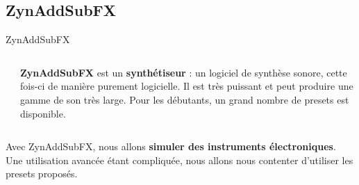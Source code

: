 \documentclass{beamer}
\begin{document}
\subsection{ZynAddSubFX}
\begin{frame}{ZynAddSubFX}
  \begin{columns}
  \begin{column}{0.15\textwidth}
    \def\svgwidth{\linewidth}
    
  \end{column}
  \begin{column}{0.85\textwidth}
    \textbf{ZynAddSubFX} est un \textbf{synthétiseur} : un logiciel de synthèse sonore, cette fois-ci de manière purement logicielle. Il est très puissant et peut produire une gamme de son très large. Pour les débutants, un grand nombre de presets est disponible.
  \end{column}
  \end{columns}
  \medskip
  
  Avec ZynAddSubFX, nous allons \textbf{simuler des instruments électroniques}.
  Une utilisation avancée étant compliquée, nous allons nous contenter d'utiliser les presets proposés.
\end{frame}

\end{document}
